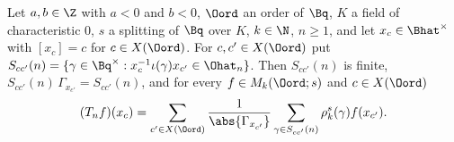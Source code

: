 Let $a,b\in\Z$ with $a<0$ and $b<0$, $\Oord$ an order of $\Bq$, $K$ a field of characteristic $0$, $s$ a splitting of $\Bq$ over $K$, $k\in\N$,
$n\ge1$, and let $x_c\in\Bhat^\times$ with $[x_c]=c$ for $c\in X(\Oord)$. For $c,c'\in X(\Oord)$ put
$S_{cc'}(n)=\{\gamma\in\Bq^\times:x_c^{-1}\iota(\gamma)x_{c'}\in\Ohat_n\}$. Then $S_{cc'}(n)$ is finite, $S_{cc'}(n)\,\Gamma_{x_{c'}}=S_{cc'}(n)$,
and for every $f\in M_k(\Oord;s)$ and $c\in X(\Oord)$
\[
  (T_nf)(x_c)=\sum_{c'\in X(\Oord)}\frac1{\abs{\Gamma_{x_{c'}}}}\sum_{\gamma\in S_{cc'}(n)}\rho_k^s(\gamma)f(x_{c'}).
\]
